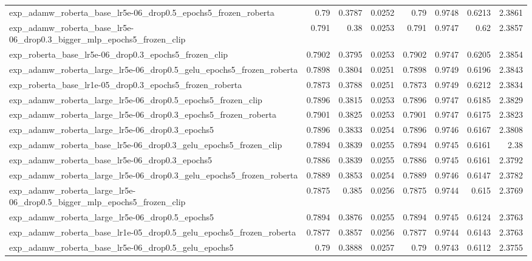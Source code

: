 \documentclass[a4paper,oneside,bibliography=totoc]{scrbook}
\begin{document}
\begin{landscape}
\begin{center}
\begin{longtable}{p{4cm} *{7}{r}}
        exp\_adamw\_roberta\_base\_lr5e-06\_drop0.5\_epochs5\_frozen\_roberta & 0.79 & 0.3787 & 0.0252 & 0.79 & 0.9748 & 0.6213 & 2.3861 \\ 
        exp\_adamw\_roberta\_base\_lr5e-06\_drop0.3\_bigger\_mlp\_epochs5\_frozen\_clip & 0.791 & 0.38 & 0.0253 & 0.791 & 0.9747 & 0.62 & 2.3857 \\ 
        exp\_roberta\_base\_lr5e-06\_drop0.3\_epochs5\_frozen\_clip & 0.7902 & 0.3795 & 0.0253 & 0.7902 & 0.9747 & 0.6205 & 2.3854 \\ 
        exp\_adamw\_roberta\_large\_lr5e-06\_drop0.5\_gelu\_epochs5\_frozen\_roberta & 0.7898 & 0.3804 & 0.0251 & 0.7898 & 0.9749 & 0.6196 & 2.3843 \\ 
        exp\_roberta\_base\_lr1e-05\_drop0.3\_epochs5\_frozen\_roberta & 0.7873 & 0.3788 & 0.0251 & 0.7873 & 0.9749 & 0.6212 & 2.3834 \\ 
        exp\_adamw\_roberta\_large\_lr5e-06\_drop0.5\_epochs5\_frozen\_clip & 0.7896 & 0.3815 & 0.0253 & 0.7896 & 0.9747 & 0.6185 & 2.3829 \\ 
        exp\_adamw\_roberta\_large\_lr5e-06\_drop0.3\_epochs5\_frozen\_roberta & 0.7901 & 0.3825 & 0.0253 & 0.7901 & 0.9747 & 0.6175 & 2.3823 \\ 
        exp\_adamw\_roberta\_large\_lr5e-06\_drop0.3\_epochs5 & 0.7896 & 0.3833 & 0.0254 & 0.7896 & 0.9746 & 0.6167 & 2.3808 \\ 
        exp\_adamw\_roberta\_base\_lr5e-06\_drop0.3\_gelu\_epochs5\_frozen\_clip & 0.7894 & 0.3839 & 0.0255 & 0.7894 & 0.9745 & 0.6161 & 2.38 \\ 
        exp\_adamw\_roberta\_base\_lr5e-06\_drop0.3\_epochs5 & 0.7886 & 0.3839 & 0.0255 & 0.7886 & 0.9745 & 0.6161 & 2.3792 \\ 
        exp\_adamw\_roberta\_large\_lr5e-06\_drop0.3\_gelu\_epochs5\_frozen\_roberta & 0.7889 & 0.3853 & 0.0254 & 0.7889 & 0.9746 & 0.6147 & 2.3782 \\ 
        exp\_adamw\_roberta\_large\_lr5e-06\_drop0.5\_bigger\_mlp\_epochs5\_frozen\_clip & 0.7875 & 0.385 & 0.0256 & 0.7875 & 0.9744 & 0.615 & 2.3769 \\ 
        exp\_adamw\_roberta\_large\_lr5e-06\_drop0.5\_epochs5 & 0.7894 & 0.3876 & 0.0255 & 0.7894 & 0.9745 & 0.6124 & 2.3763 \\ 
        exp\_adamw\_roberta\_base\_lr1e-05\_drop0.5\_gelu\_epochs5\_frozen\_roberta & 0.7877 & 0.3857 & 0.0256 & 0.7877 & 0.9744 & 0.6143 & 2.3763 \\ 
        exp\_adamw\_roberta\_base\_lr5e-06\_drop0.5\_gelu\_epochs5 & 0.79 & 0.3888 & 0.0257 & 0.79 & 0.9743 & 0.6112 & 2.3755 \\ 

\end{longtable}
\end{center}
\end{landscape}
\end{document}
